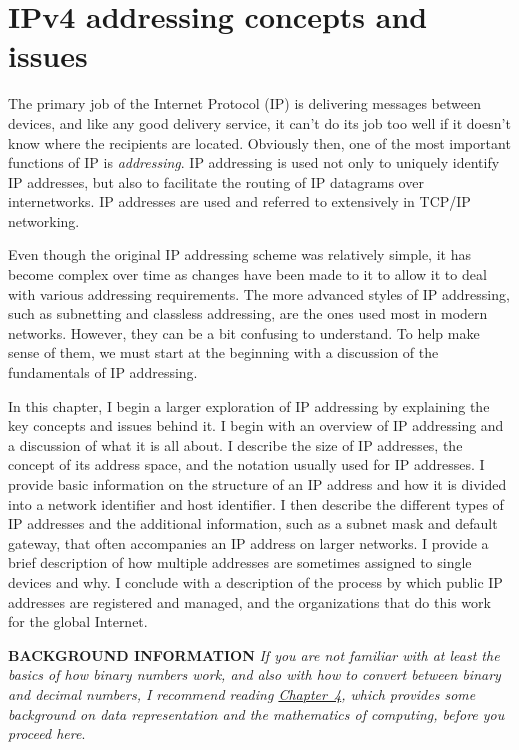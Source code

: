 \chapter{IPv4 addressing concepts and issues}
\label{chap:kozierok-ch16}

The primary job of the Internet Protocol (IP) is delivering messages
between devices, and like any good delivery service, it can't do its job
too well if it doesn't know where the recipients are located. Obviously
then, one of the most important functions of IP is {\emph{addressing}}.
IP addressing is used not only to uniquely identify IP addresses, but
also to facilitate the routing of IP datagrams over internetworks. IP
addresses are used and referred to extensively in TCP/IP networking.

Even though the original IP addressing scheme was relatively simple, it
has become complex over time as changes have been made to it to allow it
to deal with various addressing requirements. The more advanced styles
of IP addressing, such as subnetting and classless addressing, are the
ones used most in modern networks. However, they can be a bit confusing
to understand. To help make sense of them, we must start at the
beginning with a discussion of the fundamentals of IP addressing.

In this chapter, I begin a larger exploration of
\protect\hypertarget{ch16.htmlux5cux23idx-CHP-16-0646}{}{}IP addressing
by explaining the key concepts and issues behind it. I begin with an
overview of IP addressing and a discussion of what it is all about. I
describe the size of IP addresses, the concept of its address space, and
the notation usually used for IP addresses. I provide basic information
on the structure of an IP address and how it is divided into a network
identifier and host identifier. I then describe the different types of
IP addresses and the additional information, such as a subnet mask and
default gateway, that often accompanies an IP address on larger
networks. I provide a brief description of how multiple addresses are
sometimes assigned to single devices and why. I conclude with a
description of the process by which public IP addresses are registered
and managed, and the organizations that do this work for the global
Internet.

{\textbf{BACKGROUND INFORMATION}} {\emph{If you are not familiar with at
least the basics of how binary numbers work, and also with how to
convert between binary and decimal numbers, I recommend reading
\protect\hyperlink{ch04.html}{Chapter~4}, which provides some background
on data representation and the mathematics of computing, before you
proceed here}}.




